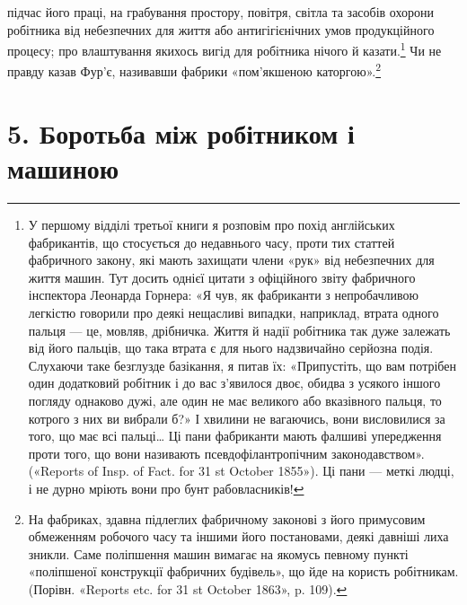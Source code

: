 підчас його праці, на грабування простору, повітря, світла
та засобів охорони робітника від небезпечних для життя або антигігієнічних
умов продукційного процесу; про влаштування якихось
вигід для робітника нічого й казати.\footnote{
У першому відділі третьої книги я розповім про похід англійських
фабрикантів, що стосується до недавнього часу, проти тих статтей фабричного
закону, які мають захищати члени «рук» від небезпечних для життя
машин. Тут досить однієї цитати з офіційного звіту фабричного інспектора
Леонарда Горнера: «Я чув, як фабриканти з непробачливою легкістю
говорили про деякі нещасливі випадки, наприклад, втрата одного пальця —
це, мовляв, дрібничка. Життя й надії робітника так дуже залежать від
його пальців, що така втрата є для нього надзвичайно серйозна подія.
Слухаючи таке безглузде базікання, я питав їх: «Припустіть, що вам потрібен
один додатковий робітник і до вас з’явилося двоє, обидва з усякого
іншого погляду однаково дужі, але один не має великого або вказівного
пальця, то котрого з них ви вибрали б?» І хвилини не вагаючись, вони
висловилися за того, що має всі пальці\dots{} Ці пани фабриканти мають
фалшиві упередження проти того, що вони називають псевдофілантропічним
законодавством». («Reports of Insp. of Fact. for 31 st October
1855»). Ці пани — меткі людці, і не дурно мріють вони про бунт рабовласників!
} Чи не правду казав Фур’є, називавши фабрики «пом’якшеною каторгою».\footnote{
На фабриках, здавна підлеглих фабричному законові з його примусовим
обмеженням робочого часу та іншими його постановами, деякі
давніші лиха зникли. Саме поліпшення машин вимагає на якомусь певному
пункті «поліпшеної конструкції фабричних будівель», що йде на
користь робітникам. (Порівн. «Reports etc. for 31 st October 1863», p. 109).
}

\section*{5. Боротьба між робітником і машиною}

